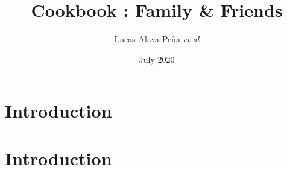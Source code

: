 \documentclass{book}
\title{Cookbook : Family \& Friends}
\author{Lucas Alava Peña \textit{et al}}
\date{July 2020}
\begin{document}
\maketitle
\tableofcontents

\chapter{Introduction}

\chapter{Introduction}
\end{document}
